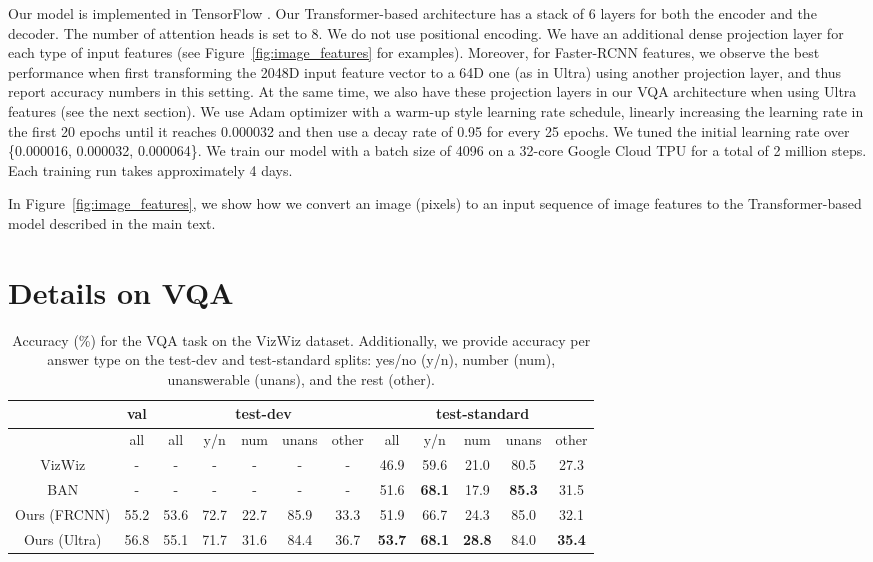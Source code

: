 \documentclass[11pt,a4paper]{article}
\begin{document}
Our model is implemented in TensorFlow \cite{tensorflow2015-whitepaper}.
Our Transformer-based architecture has a stack of 6 layers for both the encoder and the decoder.
The number of attention heads is set to 8.
We do not use positional encoding.
We have an additional dense projection layer for each type of input features (see Figure~\ref{fig:image_features} for examples).
Moreover, for Faster-RCNN features, we observe the best performance when first transforming the 2048D input feature vector to a 64D one (as in Ultra) using another projection layer, and thus report accuracy numbers in this setting.
At the same time, we also have these projection layers in our VQA architecture when using Ultra features (see the next section).
We use Adam optimizer \cite{adam} with a warm-up style learning rate schedule, linearly increasing the learning rate in the first 20 epochs until it reaches 0.000032 and then use a decay rate of 0.95 for every 25 epochs.
We tuned the initial learning rate over \{0.000016, 0.000032, 0.000064\}.
We train our model with a batch size of 4096 on a 32-core Google Cloud TPU for a total of 2 million steps.
Each training run takes approximately 4 days.

In Figure~\ref{fig:image_features}, we show how we convert an image (pixels) to an input sequence of image features to the Transformer-based model described in the main text.

\section{Details on VQA}

\begin{table*}[ht]
\small
\begin{center}
\begin{tabular}{c|c|c|c|c|c|c|c|c|c|c|c}
& val & \multicolumn{5}{c|}{test-dev} & \multicolumn{5}{c}{test-standard} \\ \hline
 & all & all & y/n & num & unans & other & all & y/n & num & unans & other \\ \hline
VizWiz \cite{gurari18vizwiz} & - & - & - & - & - & - & 46.9 & 59.6 & 21.0 & 80.5 & 27.3 \\
BAN \cite{kim18banvizwiz} & - & - & - & - & - & - & 51.6 & \textbf{68.1} & 17.9 & \textbf{85.3} & 31.5 \\ \hline \hline
Ours (FRCNN) & 55.2 & 53.6 & 72.7 & 22.7 & 85.9 & 33.3 & 51.9 & 66.7 & 24.3 & 85.0 & 32.1 \\
Ours (Ultra) & 56.8 & 55.1 & 71.7 & 31.6 & 84.4 & 36.7 & \textbf{53.7} & \textbf{68.1} & \textbf{28.8} & 84.0 & \textbf{35.4} \\ \hline
\end{tabular}
\vspace{-7pt}
\caption {Accuracy (\%) for the VQA task on the VizWiz dataset.
Additionally, we provide accuracy per answer type on the test-dev and test-standard splits: yes/no (y/n), number (num), unanswerable (unans), and the rest (other).}
\vspace{-10pt}
\label{tab:supp-results-vqa}
\end{center}
\end{table*}
\end{document}
